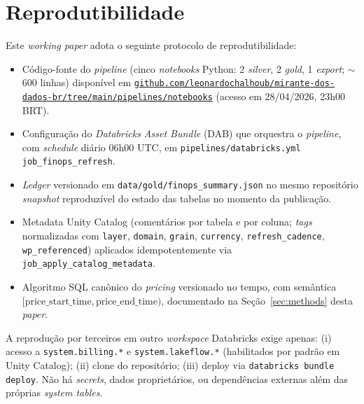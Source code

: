 \documentclass[12pt,a4paper,oneside]{article}
\begin{document}
\section{Reprodutibilidade}\label{sec:reproducibility}

Este \textit{working paper} adota o seguinte protocolo de
reprodutibilidade:

\begin{itemize}\setlength{\itemsep}{2pt}
  \item Código-fonte do \textit{pipeline} (cinco \textit{notebooks}
        Python: 2 \textit{silver}, 2 \textit{gold}, 1 \textit{export};
        \(\sim\)600 linhas) disponível em
        \href{https://github.com/leonardochalhoub/mirante-dos-dados-br/tree/main/pipelines/notebooks}%
        {\texttt{github.com/leonardochalhoub/mirante-dos-dados-br/tree/main/pipelines/notebooks}}
        (acesso em 28/04/2026, 23h00 BRT).
  \item Configuração do \textit{Databricks Asset Bundle} (DAB)
        que orquestra o \textit{pipeline}, com \textit{schedule}
        diário 06h00 UTC, em \texttt{pipelines/databricks.yml}
        \texttt{job\_finops\_refresh}.
  \item \textit{Ledger} versionado em
        \texttt{data/gold/finops\_summary.json} no mesmo
        repositório \textemdash{} \textit{snapshot} reproduzível
        do estado das tabelas no momento da publicação.
  \item Metadata Unity Catalog (comentários por tabela e por
        coluna; \textit{tags} normalizadas com \texttt{layer},
        \texttt{domain}, \texttt{grain}, \texttt{currency},
        \texttt{refresh\_cadence}, \texttt{wp\_referenced}) aplicados
        idempotentemente via \texttt{job\_apply\_catalog\_metadata}.
  \item Algoritmo SQL canônico do \textit{pricing} versionado
        no tempo, com semântica
        \([\text{price\_start\_time}, \text{price\_end\_time})\),
        documentado na Seção~\ref{sec:methods} desta
        \textit{paper}.
\end{itemize}

A reprodução por terceiros em outro \textit{workspace} Databricks
exige apenas: (i) acesso a \texttt{system.billing.*} e
\texttt{system.lakeflow.*} (habilitados por padrão em Unity Catalog);
(ii) clone do repositório; (iii) deploy via
\texttt{databricks bundle deploy}. Não há \textit{secrets}, dados
proprietários, ou dependências externas além das próprias
\textit{system tables}.
\end{document}
